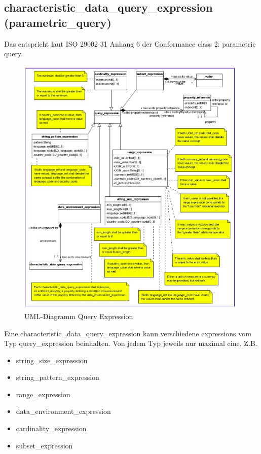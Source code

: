 \subsection{characteristic\_data\_query\_expression (parametric\_query)}\label{sec:characteristicdataqueryexpression}
Das entspricht laut ISO 29002-31 Anhang 6 der Conformance class 2: parametric query.

\begin{figure}[htbp]
	\centering
		\includegraphics[width=0.99\textwidth]{images/query_expression.jpg}
		\caption[UML-Diagramm Query Expression]{UML-Diagramm Query Expression\footnotemark}
	\label{fig:umlqueryexpression}
\end{figure}

Eine characteristic\_data\_query\_expression kann verschiedene expressions vom Typ query\_expression beinhalten. Von jedem Typ jeweils nur maximal eine. 
Z.B.
\begin{itemize}
\item string\_size\_expression
\item string\_pattern\_expression
\item range\_expression
\item data\_environment\_expression
\item cardinality\_expression
\item subset\_expression
\end{itemize}

